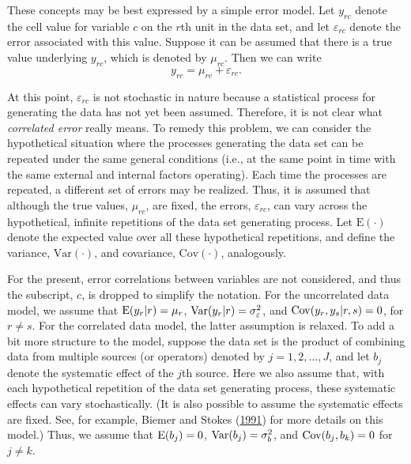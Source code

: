 \documentclass[]{krantz}
\begin{document}
These concepts may be best expressed by a simple error model. Let
\(y_{rc}\) denote the cell value for variable \(c\) on the \(r\)th unit
in the data set, and let \(\varepsilon_{rc}\) denote the error
associated with this value. Suppose it can be assumed that there is a
true value underlying \(y_{rc}\), which is denoted by \(\mu_{rc}\). Then
we can write \[\label{eq:10-1.1}
y_{rc} = \mu_{rc} + \varepsilon_{rc}.\]

At this point, \(\varepsilon_{rc}\) is not stochastic in nature because
a statistical process for generating the data has not yet been assumed.
Therefore, it is not clear what \emph{correlated error} really means. To
remedy this problem, we can consider the hypothetical situation where
the processes generating the data set can be repeated under the same
general conditions (i.e., at the same point in time with the same
external and internal factors operating). Each time the processes are
repeated, a different set of errors may be realized. Thus, it is assumed
that although the true values, \(\mu_{rc}\), are fixed, the errors,
\(\varepsilon_{rc}\), can vary across the hypothetical, infinite
repetitions of the data set generating process. Let \(\mbox{E}(\cdot)\)
denote the expected value over all these hypothetical repetitions, and
define the variance, \(\mathrm{Var}(\cdot)\), and covariance,
\(\mathrm{Cov}(\cdot)\), analogously.

For the present, error correlations between variables are not
considered, and thus the subscript, \(c\), is dropped to simplify the
notation. For the uncorrelated data model, we assume that
\({\rm E}(y_r \vert r) = \mu_r\),
\({\rm Var}(y_r \vert r) = \sigma_\varepsilon^2\), and
\({\rm Cov}(y_r ,y_s \vert r,s) = 0\), for \(r \ne s\). For the
correlated data model, the latter assumption is relaxed. To add a bit
more structure to the model, suppose the data set is the product of
combining data from multiple sources (or operators) denoted by
\(j = 1, 2, \ldots, J\), and let \(b_j\) denote the systematic effect of
the \(j\)th source. Here we also assume that, with each hypothetical
repetition of the data set generating process, these systematic effects
can vary stochastically. (It is also possible to assume the systematic
effects are fixed. See, for example, Biemer and Stokes
(\protect\hyperlink{ref-BiemerStokes1991}{1991}) for more details on
this model.) Thus, we assume that \({\rm E}(b_j ) = 0\),
\({\rm Var}(b_j ) = \sigma_b^2\), and \({\rm Cov}(b_j ,b_k ) = 0\) for
\(j \ne k\).
\end{document}
